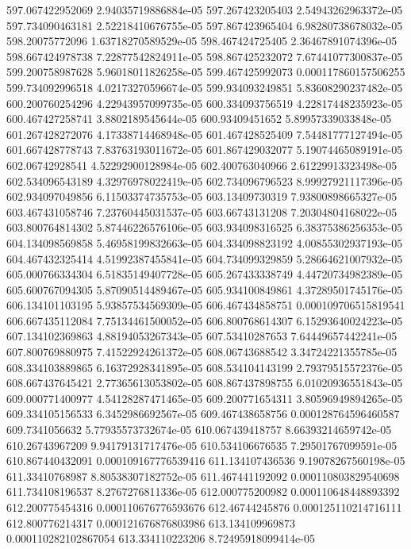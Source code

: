{597.067422952069 2.94035719886884e-05
597.267423205403 2.54943262963372e-05
597.734090463181 2.52218410676755e-05
597.867423965404 6.98280738678032e-05
598.20075772096 1.63718270589529e-05
598.467424725405 2.36467891074396e-05
598.667424978738 7.22877542824911e-05
598.867425232072 7.67441077300837e-05
599.200758987628 5.96018011826258e-05
599.467425992073 0.000117860157506255
599.734092996518 4.02173270596674e-05
599.934093249851 5.83608290237482e-05
600.200760254296 4.22943957099735e-05
600.334093756519 4.22817448235923e-05
600.467427258741 3.8802189545644e-05
600.93409451652 5.89957339033848e-05
601.267428272076 4.17338714468948e-05
601.467428525409 7.54481777127494e-05
601.667428778743 7.83763193011672e-05
601.867429032077 5.19074465089191e-05
602.06742928541 4.52292900128984e-05
602.400763040966 2.61229913323498e-05
602.534096543189 4.32976978022419e-05
602.734096796523 8.99927921117396e-05
602.934097049856 6.11503374735753e-05
603.13409730319 7.93800898665327e-05
603.467431058746 7.23760445031537e-05
603.66743131208 7.20304804168022e-05
603.800764814302 5.87446226576106e-05
603.934098316525 6.38375386256353e-05
604.134098569858 5.46958199832663e-05
604.334098823192 4.00855302937193e-05
604.467432325414 4.51992387455841e-05
604.734099329859 5.28664621007932e-05
605.000766334304 6.51835149407728e-05
605.267433338749 4.44720734982389e-05
605.600767094305 5.87090514489467e-05
605.934100849861 4.37289501745176e-05
606.134101103195 5.93857534569309e-05
606.467434858751 0.000109706515819541
606.667435112084 7.75134461500052e-05
606.800768614307 6.15293640024223e-05
607.134102369863 4.88194053267343e-05
607.53410287653 7.64449657442241e-05
607.800769880975 7.41522924261372e-05
608.06743688542 3.34724221355785e-05
608.334103889865 6.16372928341895e-05
608.534104143199 2.79379515572376e-05
608.667437645421 2.77365613053802e-05
608.867437898755 6.01020936551843e-05
609.000771400977 4.54128287471465e-05
609.200771654311 3.80596949894265e-05
609.334105156533 6.3452986692567e-05
609.467438658756 0.000128764596460587
609.7341056632 5.77935573732674e-05
610.067439418757 8.66393214659742e-05
610.26743967209 9.94179131717476e-05
610.534106676535 7.29501767099591e-05
610.867440432091 0.000109167776539416
611.134107436536 9.19078267560198e-05
611.33410768987 8.80538307182752e-05
611.467441192092 0.000110803829540698
611.734108196537 8.2767276811336e-05
612.000775200982 0.000110648448893392
612.200775454316 0.000110676776593676
612.46744245876 0.000125110214716111
612.800776214317 0.000121676876803986
613.134109969873 0.000110282102867054
613.334110223206 8.72495918099414e-05
}

